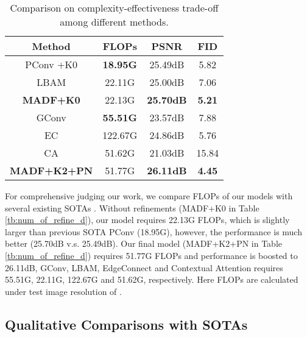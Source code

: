 \documentclass[journal]{IEEEtran}
\begin{document}
\begin{table}[!t]
    \centering
    {\color{black}\begin{tabular}{c|c|c|c} 
    \hline
         Method &FLOPs &PSNR &FID  \\
         \hline
         PConv \cite{liu2018image}+K0       &\textbf{18.95G}    &25.49dB &5.82 \\
         LBAM \cite{chaohaoLBAM2019}       &22.11G    &25.00dB    &7.06 \\
         \textbf{MADF+K0}     &{22.13G}    &\textbf{25.70dB} &\textbf{5.21}\\
         \hline
         GConv \cite{yu2019free}       &\textbf{55.51G}    &23.57dB &7.88     \\
         EC \cite{nazeri2019edgeconnect}&122.67G   &24.86dB &5.76       \\
         CA \cite{yu2018generative}          &51.62G    &21.03dB &15.84       \\
         \textbf{MADF+K2+PN}  &{51.77G}    &\textbf{26.11dB} &\textbf{4.45}\\
         \hline
    \end{tabular}}
    \caption{Comparison on complexity-effectiveness trade-off among different methods.}
    \label{tab:my_label}
\end{table}
For comprehensive judging our work, we compare FLOPs of our  models  with  several  existing SOTAs {}. {\color{black}{In this paper, we measure the model complexity by the well-known metric of ``FLOPs''. It measures the float point operations of a model. We report the number of float point multiplications instead of number of model parameters in this paper, because float point multiplication contributes much more to the model complexity compared to addition operation and it is a better indicator of model inference speed compared to number of model parameters.}}
Without  refinements  (MADF+K0  in  Table \ref{tb:num_of_refine_d}),  our  model  requires 22.13G FLOPs, which is slightly larger than previous SOTA PConv (18.95G), however, the performance is much better (25.70dB v.s.  25.49dB). Our final model (MADF+K2+PN in Table \ref{tb:num_of_refine_d})  requires  51.77G  FLOPs  and  performance  is boosted  to  26.11dB,  GConv,  LBAM,  EdgeConnect  and Contextual Attention requires 55.51G, 22.11G, 122.67G and 51.62G, respectively. Here FLOPs are calculated under test image resolution of .

\subsection{Qualitative Comparisons with SOTAs}
\end{document}
